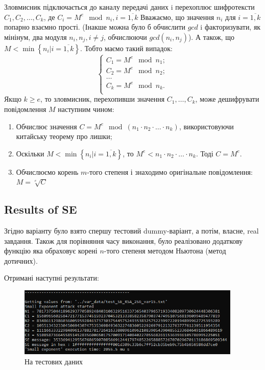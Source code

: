 Зловмисник підключається до каналу передачі даних i перехоплює шифротексти $C_{1}, C_{2}, \dots, C_{k}$, де 
$C_{i} = M^{e} \mod n_{i}, i = \overline{1, k}$ 
Вважаємо, що значення $n_{i}$ для $i = \overline{1, k}$ попарно взаємно прості. (Інакше можна було б обчислити 
$gcd$ i факторизувати, як мінінум, два модуля $n_{i}, n_{j}, i \neq j$, обчислюючи $gcd(n_{i}, n_{j})$). 
А також, що $M < \min\left\{n_{i} \vert i = \overline{1, k}\right\}$. Тобто маємо такий випадок:
\begin{equation*}
    \begin{cases}
        C_{1} = M^{e} \mod n_{1}; \\
        C_{2} = M^{e} \mod n_{2}; \\
        \dots \\
        C_{k} = M^{e} \mod n_{k}. \\
    \end{cases}
\end{equation*}
Якщо $k \geq e$, то зловмисник, перехопивши значення $C_{1}, \dots, C_{k}$, може дешифрувати повідомлення $M$ наступним 
чином:
\begin{enumerate}
    \item Обчислює значення $C = M^{e} \mod \left(n_{1} \cdot n_{2} \cdot \ldots \cdot n_{k}\right)$, 
        використовуючи китайську теорему про лишки;
    \item Оскільки $M < \min\left\{n_{i} \vert i = \overline{1, k}\right\}$, то $M^{e} < n_{1} \cdot n_{2} \cdot \ldots \cdot n_{k}$. 
        Тоді $C = M^{e}$.
    \item Обчислюємо корень $m$-того степеня і знаходимо оригінальне повідомлення: $M = \sqrt[e]{C}$
\end{enumerate}
\subsection{Results of SE}
Згідно варіанту було взято спершу тестовий dummy-варіант, а потім, власне, real завдання. Також для порівняння часу виконання, 
було реалізовано додаткову функцію яка обраховує корені $n$-того степеня методом Ньютона (метод дотичних).

Отримані наступні результати: 
\begin{figure}[!ht]
    \centering
    \begin{minipage}{0.95\linewidth}
        \includegraphics[width=0.95\textwidth, scale=1.2]{ReportPic/report_1_SE_test.png}
    \end{minipage}
    \caption{На тестових даних}
\end{figure}

